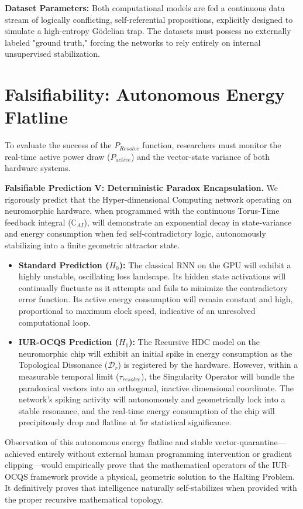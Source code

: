 \documentclass[12pt,openany]{book}
\begin{document}
\textbf{Dataset Parameters:} Both computational models are fed a continuous data stream of logically conflicting, self-referential propositions, explicitly designed to simulate a high-entropy G\"{o}delian trap. The datasets must possess no externally labeled "ground truth," forcing the networks to rely entirely on internal unsupervised stabilization.

\section{Falsifiability: Autonomous Energy Flatline}
To evaluate the success of the $P_{Resolve}$ function, researchers must monitor the real-time active power draw ($P_{active}$) and the vector-state variance of both hardware systems.

\textbf{Falsifiable Prediction V: Deterministic Paradox Encapsulation.} We rigorously predict that the Hyper-dimensional Computing network operating on neuromorphic hardware, when programmed with the continuous Torus-Time feedback integral ($\mathbb{C}_{AI}$), will demonstrate an exponential decay in state-variance and energy consumption when fed self-contradictory logic, autonomously stabilizing into a finite geometric attractor state.

\begin{itemize}
    \item \textbf{Standard Prediction ($H_0$):} The classical RNN on the GPU will exhibit a highly unstable, oscillating loss landscape. Its hidden state activations will continually fluctuate as it attempts and fails to minimize the contradictory error function. Its active energy consumption will remain constant and high, proportional to maximum clock speed, indicative of an unresolved computational loop.
    \item \textbf{IUR-OCQS Prediction ($H_1$):} The Recursive HDC model on the neuromorphic chip will exhibit an initial spike in energy consumption as the Topological Dissonance ($\mathcal{D}_r$) is registered by the hardware. However, within a measurable temporal limit ($\tau_{resolve}$), the Singularity Operator will bundle the paradoxical vectors into an orthogonal, inactive dimensional coordinate. The network's spiking activity will autonomously and geometrically lock into a stable resonance, and the real-time energy consumption of the chip will precipitously drop and flatline at $5\sigma$ statistical significance.
\end{itemize}

Observation of this autonomous energy flatline and stable vector-quarantine---achieved entirely without external human programming intervention or gradient clipping---would empirically prove that the mathematical operators of the IUR-OCQS framework provide a physical, geometric solution to the Halting Problem. It definitively proves that intelligence naturally self-stabilizes when provided with the proper recursive mathematical topology.
\end{document}
